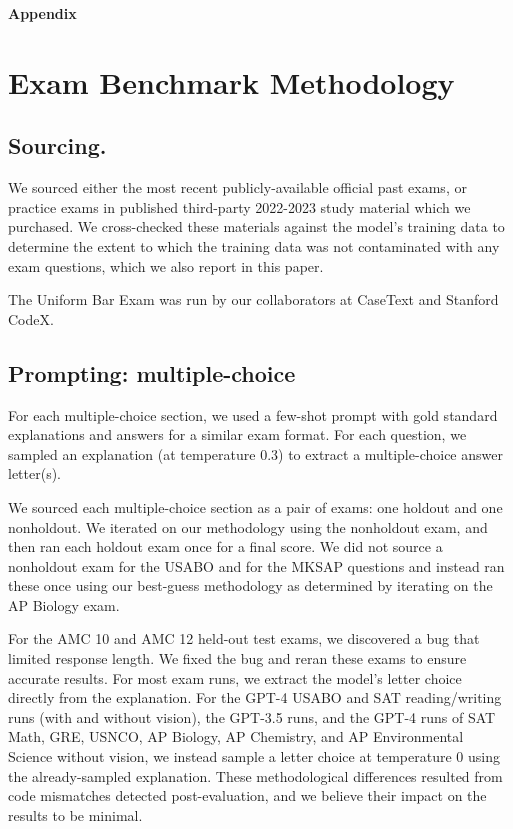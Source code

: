 \documentclass{article}
\begin{document}
{}


\newpage
\begin{center}
\textbf{Appendix}    
\end{center}
\appendix
\section{Exam Benchmark Methodology}
\label{appendix:exam_methodology}
\subsection{Sourcing.} We sourced either the most recent publicly-available official past exams, or practice exams in published third-party 2022-2023 study material which we purchased. We cross-checked these materials against the model's training data to determine the extent to which the training data was not contaminated with any exam questions, which we also report in this paper.

The Uniform Bar Exam was run by our collaborators at CaseText and Stanford CodeX.

\subsection{Prompting: multiple-choice} \label{appendix:exam_mcq_prompting} For each multiple-choice section, we used a few-shot prompt with gold standard explanations and answers for a similar exam format. For each question, we sampled an explanation (at temperature 0.3) to extract a multiple-choice answer letter(s). 

We sourced each multiple-choice section as a pair of exams: one holdout and one nonholdout. We iterated on our methodology using the nonholdout exam, and then ran each holdout exam once for a final score. We did not source a nonholdout exam for the USABO and for the MKSAP questions and instead ran these once using our best-guess methodology as determined by iterating on the AP Biology exam.

For the AMC 10 and AMC 12 held-out test exams, we discovered a bug that limited response length. We fixed the bug and reran these exams to ensure accurate results. For most exam runs, we extract the model's letter choice directly from the explanation. For the GPT-4 USABO and SAT reading/writing runs (with and without vision), the GPT-3.5 runs, and the GPT-4 runs of SAT Math, GRE, USNCO, AP Biology, AP Chemistry, and AP Environmental Science without vision, we instead sample a letter choice at temperature 0 using the already-sampled explanation. These methodological differences resulted from code mismatches detected post-evaluation, and we believe their impact on the results to be minimal.
\end{document}
